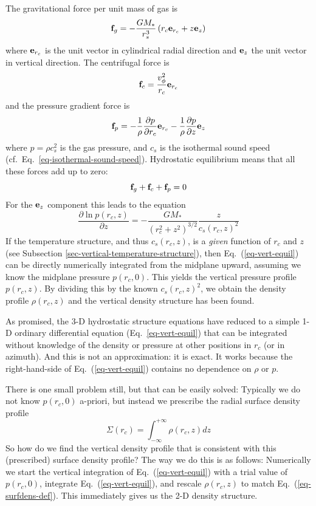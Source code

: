 \documentclass{book}
\begin{document}
The gravitational force per unit mass of gas is
\begin{equation}\label{eq-force-grav}
{\bf f}_g = -\frac{GM_{*}}{r_s^3}\left(r_c{\bf e}_{r_c}+z{\bf e}_{z}\right)
\end{equation}
where ${\bf e}_{r_c}$ is the unit vector in cylindrical radial direction
and ${\bf e}_{z}$ the unit vector in vertical direction. The centrifugal force is
\begin{equation}\label{eq-force-cent}
{\bf f}_c = \frac{v_\phi^2}{r_c}{\bf e}_{r_c}
\end{equation}
and the pressure gradient force is
\begin{equation}\label{eq-force-pgrad}
  {\bf f}_p = - \frac{1}{\rho}\frac{\partial p}{\partial r_c}{\bf e}_{r_c}
  - \frac{1}{\rho}\frac{\partial p}{\partial z}{\bf e}_{z}
\end{equation}
where $p=\rho c_s^2$ is the gas pressure, and $c_s$ is the isothermal
sound speed (cf.~Eq.~\ref{eq-isothermal-sound-speed}). Hydrostatic equilibrium means
that all these forces add up to zero:
\begin{equation}
{\bf f}_g+{\bf f}_c+{\bf f}_p=0
\end{equation}
For the ${\bf e}_{z}$ component this leads to the equation
\begin{equation}\label{eq-vert-equil}
\frac{\partial \ln p(r_c,z)}{\partial z} = -\frac{GM_{*}}{(r_c^2+z^2)^{3/2}}\frac{z}{c_s(r_c,z)^2}
\end{equation}
If the temperature structure, and thus $c_s(r_c,z)$, is a {\em given} function
of $r_c$ and $z$ (see Subsection \ref{sec-vertical-temperature-structure}), then
Eq.~(\ref{eq-vert-equil}) can be directly numerically integrated from the
midplane upward, assuming we know the midplane pressure $p(r_c,0)$. This yields
the vertical pressure profile $p(r_c,z)$. By dividing this by the known
$c_s(r_c,z)^2$, we obtain the density profile $\rho(r_c,z)$ and the vertical
density structure has been found.

As promised, the 3-D hydrostatic structure equations have reduced to a simple
1-D ordinary differential equation (Eq.~\ref{eq-vert-equil}) that can be
integrated without knowledge of the density or pressure at other positions in
$r_c$ (or in azimuth). And this is not an approximation: it is exact. It works
because the right-hand-side of Eq.~(\ref{eq-vert-equil}) contains no dependence
on $\rho$ or $p$.

There is one small problem still, but that can be easily solved: Typically we do
not know $p(r_c,0)$ a-priori, but instead we prescribe the radial surface
density profile
\begin{equation}\label{eq-surfdens-def}
\Sigma(r_c) = \int_{-\infty}^{+\infty}\rho(r_c,z)dz
\end{equation}
So how do we find the vertical density profile that is consistent with this
(prescribed) surface density profile? The way we do this is as follows:
Numerically we start the vertical integration of Eq.~(\ref{eq-vert-equil}) with
a trial value of $p(r_c,0)$, integrate Eq.~(\ref{eq-vert-equil}), and rescale
$\rho(r_c,z)$ to match Eq.~(\ref{eq-surfdens-def}). This immediately gives us
the 2-D density structure.
\end{document}
